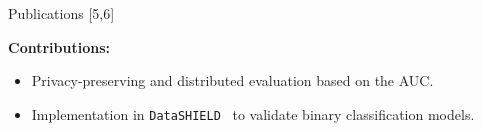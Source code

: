 \documentclass[t,10pt]{beamer}
\begin{document}
\begin{frame}{Publications [5,6]}
  \vspace{-0.2cm}
  \begin{figure}
    \centering
  \end{figure}
  \vspace{-0.4cm}

  \textbf{Contributions:}
  \begin{itemize}
    \item
      Privacy-preserving and distributed evaluation based on the AUC.
    \item
      Implementation in \texttt{DataSHIELD}~\citep{gaye2014datashield} to validate binary classification models.
  \end{itemize}
\end{frame}
\end{document}
